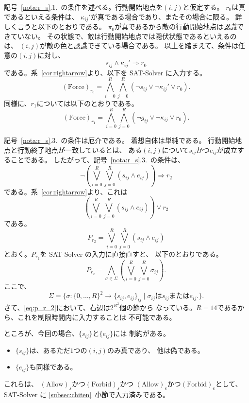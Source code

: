 記号~\ref{nota:r_s}.1.~の条件を述べる。行動開始地点を$(i, j)$と仮定する。
$r_0$は真であるといえる条件は、
$\kappa_{ij}'$が真である場合であり、またその場合に限る。
詳しく言うと以下のとおりである。
$\pi_0$が真であるから敵の行動開始地点は認識できていない。
その状態で、敵は行動開始地点では隠伏状態であるといえるのは、
$(i, j)$が敵の色と認識できている場合である。
以上を踏まえて、条件は任意の$(i, j)$に対し、
\[
 s_{ij} \land \kappa_{ij}' \Rightarrow r_0
\]
である。系~\ref{cor:rightarrow}より、以下を SAT-Solver に入力する。
\[
 (\text{Force})_{r_0} = \bigwedge_{i = 0}^R \bigwedge_{j = 0}^R 
 (\lnot s_{ij} \lor \lnot \kappa_{ij}' \lor r_0).
\]
同様に、$r_1$については以下のとおりである。
\[
 (\text{Force})_{r_1} = \bigwedge_{i = 0}^R \bigwedge_{j = 0}^R 
 (\lnot g_{ij} \lor \lnot \kappa_{ij} \lor r_0).
\]

記号~\ref{nota:r_s}.3.~の条件は厄介である。
着想自体は単純である。
行動開始地点と行動終了地点が一致しているとは、
ある$(i, j)$について$s_{ij}$かつ$e_{ij}$が成立することである。
したがって、記号~\ref{nota:r_s}.3.~の条件は、
\[
 \lnot \left( \bigvee_{i=0}^R \bigvee_{j=0}^R (s_{ij} \land e_{ij})
 \right)
 \Rightarrow r_2
\]
である。系~\ref{cor:rightarrow}より、これは
\[
 \left( \bigvee_{i=0}^R \bigvee_{j=0}^R (s_{ij} \land e_{ij})
 \right) \lor r_2
\]
である。
\begin{equation}
 P_{r_2} = \bigvee_{i=0}^R \bigvee_{j=0}^R (s_{ij} \land e_{ij})
  \label{eq:p_r_2_original}
\end{equation}
とおく。$P_{r_2}$を SAT-Solver の入力に直接直すと、
以下のとおりである。
\begin{equation}
  P_{r_2} = \bigwedge_{\sigma \in \Sigma}
   \left( 
    \bigvee_{i=0}^R \bigvee_{j=0}^R \sigma_{ij} \right).
  \label{eq:p_r_2}
\end{equation}
ここで、
\[
 \Sigma = \{ \sigma \colon \{0, \dots, R \}^2 \to \{ s_{ij} , e_{ij}
 \}_{ij} \mid \sigma_{ij} \text{は} s_{ij} \text{または} e_{ij}. \}.
\]
さて、\eqref{eq:p_r_2}において、右辺は$2^{R^2}$個の節から
なっている。$R = 14$であるから、これを制限時間内に入力することは
不可能である。

ところが、今回の場合、$\{ s_{ij} \}$と$\{ e_{ij} \}$には
制約がある。
\begin{itemize}
 \item $\{ s_{ij} \}$は、あるただ$1$つの$(i, j)$のみ真であり、
       他は偽である。
 \item $\{ e_{ij} \}$も同様である。
\end{itemize}
これらは、
$(\text{Allow})_s$かつ$(\text{Forbid})_s$かつ
$(\text{Allow})_e$かつ$(\text{Forbid})_e$として、
SAT-Solver に
\ref{subsec:chiten}~小節で入力済みである。

